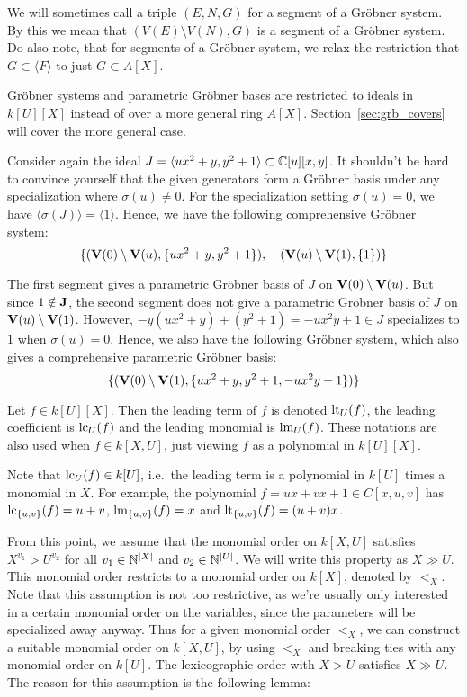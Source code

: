 We will sometimes call a triple $(E, N, G)$ for a segment of a Gröbner system. By this we mean that $(V(E) \setminus V(N), G)$ is a segment of a Gröbner system. Do also note, that for segments of a Gröbner system, we relax the restriction that $G \subset \langle F \rangle$ to just $G \subset A[X]$.

Gröbner systems and parametric Gröbner bases are restricted to ideals in $k[U][X]$ instead of over a more general ring $A[X]$. Section~\ref{sec:grb_covers} will cover the more general case.

\begin{example}\upshape
  Consider again the ideal $J = \langle ux^{2} + y, y^{2} + 1 \rangle \subset \mathbb{C}[u][x, y]$. It shouldn't be hard to convince yourself that the given generators form a Gröbner basis under any specialization where $\sigma(u) \neq 0$. For the specialization setting $\sigma(u) = 0$, we have $\langle \sigma(J) \rangle = \langle 1 \rangle$. Hence, we have the following comprehensive Gröbner system:
  \[\{(\operatorname{\mathbf V}(0) \setminus \operatorname{\mathbf V}(u), \{ux^{2} + y, y^{2} + 1\}), \quad (\operatorname{\mathbf V}(u) \setminus \operatorname{\mathbf V}(1), \{1\})\}\]

  The first segment gives a parametric Gröbner basis of $J$ on $\operatorname{\mathbf V}(0) \setminus \operatorname{\mathbf V}(u)$. But since $1 \notin \operatorname{\mathbf J}$, the second segment does not give a parametric Gröbner basis of $J$ on $\operatorname{\mathbf V}(u) \setminus \operatorname{\mathbf V}(1)$. However, $-y(ux^{2} + y) + (y^{2} + 1) = -ux^{2}y + 1 \in J$ specializes to $1$ when $\sigma(u) = 0$. Hence, we also have the following Gröbner system, which also gives a comprehensive parametric Gröbner basis:
  \[\{(\operatorname{\mathbf V}(0) \setminus \operatorname{\mathbf V}(1), \{ux^{2} + y, y^{2} + 1, -ux^{2}y + 1\})\}\]
\end{example}

\begin{definition}
  Let $f \in k[U][X]$. Then the leading term of $f$ is denoted $\operatorname{lt}_{U}(f)$, the leading coefficient is $\operatorname{lc}_{U}(f)$ and the leading monomial is $\operatorname{lm}_{U}(f)$. These notations are also used when $f \in k[X, U]$, just viewing $f$ as a polynomial in $k[U][X]$.
\end{definition}

Note that $\operatorname{lc}_{U}(f) \in k[U]$, i.e.\ the leading term is a polynomial in $k[U]$ times a monomial in $X$. For example, the polynomial $f = ux + vx + 1 \in C[x, u, v]$ has $\operatorname{lc}_{\{u, v\}}(f) = u + v$, $\operatorname{lm}_{\{u, v\}}(f) = x$ and $\operatorname{lt}_{\{u, v\}}(f) = (u+v)x$.

From this point, we assume that the monomial order on $k[X, U]$ satisfies $X^{v_{1}} > U^{v_{2}}$ for all $v_{1} \in \mathbb{N}^{|X|}$ and $v_{2} \in \mathbb{N}^{|U|}$. We will write this property as $X \gg U$. This monomial order restricts to a monomial order on $k[X]$, denoted by $<_{X}$. Note that this assumption is not too restrictive, as we're usually only interested in a certain monomial order on the variables, since the parameters will be specialized away anyway. Thus for a given monomial order $<_{X}$, we can construct a suitable monomial order on $k[X, U]$, by using $<_{X}$ and breaking ties with any monomial order on $k[U]$. The lexicographic order with $X > U$ satisfies $X \gg U$. The reason for this assumption is the following lemma:


